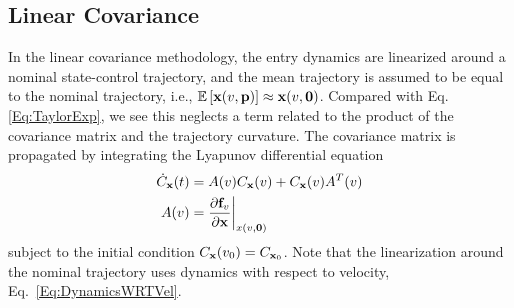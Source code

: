 
\subsection{Linear Covariance}
In the linear covariance methodology, the entry dynamics are linearized around a nominal state-control trajectory, and the mean trajectory is assumed to be equal to the nominal trajectory, i.e., $ \mathbb{E}\left[\mathbf{x}(v,\mathbf{p})\right] \approx \mathbf{x}(v,\mathbf{0}) $. Compared with Eq.\eqref{Eq:TaylorExp}, we see this neglects a term related to the product of the covariance matrix and the trajectory curvature. 
The covariance matrix is propagated by integrating the Lyapunov differential equation
\begin{align}
	\dot{C}_{\mathbf{x}}(t) &= A(v)C_{\mathbf{x}}(v) + C_{\mathbf{x}}(v)A^T(v) \\
	A(v) &= \frac{\partial \mathbf{f}_v}{\partial\mathbf{x}}\bigg\rvert_{x(v,\mathbf{0})}
\end{align}
subject to the initial condition $C_{\mathbf{x}}(v_0) = C_{\mathbf{x}_0}$. Note that the linearization around the nominal trajectory uses dynamics with respect to velocity, Eq.~\eqref{Eq:DynamicsWRTVel}. 

